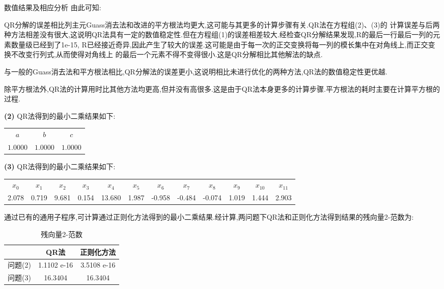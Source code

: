 \documentclass{article}
\begin{document}
\begin{section}{数值结果及相应分析}
    由此可知:
    \begin{compactitem} 
        \item QR分解的误差相比列主元Guass消去法和改进的平方根法均更大,这可能与其更多的计算步骤有关.QR法在方程组(2)、(3)的
        计算误差与后两种方法相差没有很大,这说明QR法具有一定的数值稳定性.但在方程组(1)的误差相差较大.经检查QR分解结果发现,R的最后一行最后一列的元素数量级已经到了1e-15,
        R已经接近奇异,因此产生了较大的误差.这可能是由于每一次的正交变换将每一列的模长集中在对角线上,而正交变换不改变行列式,从而使得对角线上
        的最后一个元素不得不变得很小.这是QR分解相比其他解法的缺点.
        \item 与一般的Guass消去法和平方根法相比,QR分解法的误差更小,这说明相比未进行优化的两种方法,QR法的数值稳定性更优越.
        \item 除平方根法外,QR法的计算用时比其他方法均更高,但并没有高很多.这是由于QR法本身更多的计算步骤.平方根法的耗时主要在计算平方根的过程.\\
   \end{compactitem}
   \noindent\textbf{(2)} QR法得到的最小二乘结果如下:
   \begin{table}[ht]
    \centering
    \begin{tabular}{ccc}
        \hline
        $a$ & $b$ & $c$ \\
        $1.0000$ & $1.0000$ & $1.0000$ \\
        \hline
    \end{tabular}
    \end{table}

    \noindent\textbf{(3)} QR法得到的最小二乘结果如下:
    \begin{table}[htbp!]
        \centering
        \begin{tabular}{cccccccccccc}\hline
        $x_0$    & $x_1$    & $x_2$    & $x_3$    & $x_4$    & $x_5$    & $x_6$    & $x_7$    & $x_8$    & $x_9$  & $x_{10}$ & $x_{11}$ \\
        2.078 & 0.719 & 9.681 & 0.154 & 13.680 & 1.987 & -0.958 & -0.484 & -0.074 & 1.019 & 1.444 & 2.903 \\ \hline
        \end{tabular}
    \end{table}
    
    通过已有的通用子程序,可计算通过正则化方法得到的最小二乘结果.经计算,两问题下QR法和正则化方法得到结果的残向量2-范数为:
    \begin{table}[htbp!]
        \centering
        \caption{残向量2-范数}
        \begin{tabular}{ccc}\hline
              & QR法        & 正则化方法      \\ \hline
        问题(2) & 1.1102 e-16 & 3.5108 e-16 \\
        问题(3) & 16.3404    & 16.3404   \\ \hline
        \end{tabular}
    \end{table}
    

\end{section}
\end{document}
